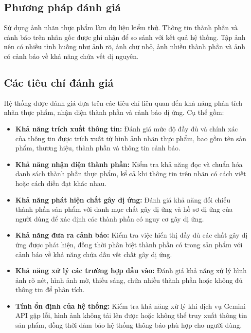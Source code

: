 \subsection{Phương pháp đánh giá}

Sử dụng ảnh nhãn thực phẩm làm dữ liệu kiểm thử. Thông tin thành phần
và cảnh báo trên nhãn gốc được ghi nhận để so sánh với kết quả hệ thống.
Tập ảnh nên có nhiều tình huống như ảnh rõ, ảnh chữ nhỏ, ảnh nhiều
thành phần và ảnh có cảnh báo về khả năng chứa vết dị nguyên.

\subsection{Các tiêu chí đánh giá}

Hệ thống được đánh giá dựa trên các tiêu chí liên quan đến khả năng
phân tích nhãn thực phẩm, nhận diện thành phần và cảnh báo dị ứng.
Cụ thể gồm:

\begin{itemize}
	\item \textbf{Khả năng trích xuất thông tin:}
	Đánh giá mức độ đầy đủ và chính xác của thông tin được trích xuất
	từ hình ảnh nhãn thực phẩm, bao gồm tên sản phẩm, thương hiệu,
	thành phần và thông tin cảnh báo.
	
	\item \textbf{Khả năng nhận diện thành phần:}
	Kiểm tra khả năng đọc và chuẩn hóa danh sách thành phần thực phẩm,
	kể cả khi thông tin trên nhãn có cách viết hoặc cách diễn đạt khác nhau.
	
	\item \textbf{Khả năng phát hiện chất gây dị ứng:}
	Đánh giá khả năng đối chiếu thành phần sản phẩm với danh mục
	chất gây dị ứng và hồ sơ dị ứng của người dùng để xác định
	các thành phần có nguy cơ gây dị ứng.
	
	\item \textbf{Khả năng đưa ra cảnh báo:}
	Kiểm tra việc hiển thị đầy đủ các chất gây dị ứng được phát hiện,
	đồng thời phân biệt thành phần có trong sản phẩm với cảnh báo
	về khả năng chứa dấu vết chất gây dị ứng.
	
	\item \textbf{Khả năng xử lý các trường hợp đầu vào:}
	Đánh giá khả năng xử lý hình ảnh rõ nét, hình ảnh mờ,
	thiếu sáng, chứa nhiều thành phần hoặc không đủ thông tin
	để phân tích.
	
	\item \textbf{Tính ổn định của hệ thống:}
	Kiểm tra khả năng xử lý khi dịch vụ Gemini API gặp lỗi,
	hình ảnh không tải lên được hoặc không thể truy xuất thông tin
	sản phẩm, đồng thời đảm bảo hệ thống thông báo phù hợp
	cho người dùng.
\end{itemize}

